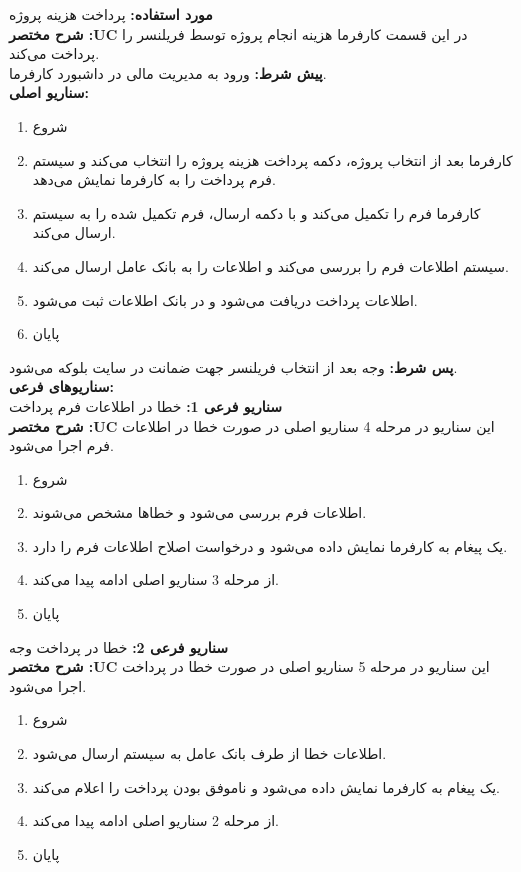 \textbf{مورد استفاده:}
پرداخت هزینه پروژه
\\
\textbf{شرح مختصر :UC}
در این قسمت کارفرما هزینه انجام پروژه توسط فریلنسر را پرداخت می‌کند.
\\
\textbf{پيش شرط:}
ورود به مدیریت مالی در داشبورد کارفرما.
\\
\textbf{سناريو اصلی:}
\begin{enumerate}
\item
شروع
\item
کارفرما بعد از انتخاب پروژه، دکمه پرداخت هزینه پروژه را انتخاب می‌کند و سیستم فرم پرداخت را به کارفرما نمایش می‌دهد.
\item
کارفرما فرم را تکمیل می‌کند و با دکمه ارسال، فرم تکمیل شده را به سیستم ارسال می‌کند.
\item
سیستم اطلاعات فرم را بررسی می‌کند و اطلاعات را به بانک عامل ارسال می‌کند.
\item
اطلاعات پرداخت دریافت می‌شود و در بانک اطلاعات ثبت می‌شود.
\item
پایان
\end{enumerate}

\noindent
\textbf{پس شرط:}
وجه بعد از انتخاب فریلنسر جهت ضمانت در سایت بلوکه می‌شود.
\\
\textbf{سناريوهای فرعی:}
\\
\textbf{سناريو فرعی 1:}
خطا در اطلاعات فرم پرداخت
\\
\textbf{شرح مختصر :UC}
این سناریو در مرحله 4 سناریو اصلی در صورت خطا در اطلاعات فرم اجرا می‌شود.
\begin{enumerate}
\item
شروع
\item
اطلاعات فرم بررسی می‌شود و خطاها مشخص می‌شوند.
\item
یک پیغام به کارفرما نمایش داده می‌شود و درخواست اصلاح اطلاعات فرم را دارد.
\item
از مرحله 3 سناریو اصلی ادامه پیدا می‌کند.
\item
پایان
\end{enumerate}

\noindent
\textbf{سناريو فرعی 2:}
خطا در پرداخت وجه
\\
\textbf{شرح مختصر :UC}
این سناریو در مرحله 5 سناریو اصلی در صورت خطا در پرداخت اجرا می‌شود.
\begin{enumerate}
\item
شروع
\item
اطلاعات خطا از طرف بانک عامل به سیستم ارسال می‌شود.
\item
یک پیغام به کارفرما نمایش داده می‌شود و ناموفق بودن پرداخت را اعلام می‌کند.
\item
از مرحله 2 سناریو اصلی ادامه پیدا می‌کند.
\item
پایان
\end{enumerate}


